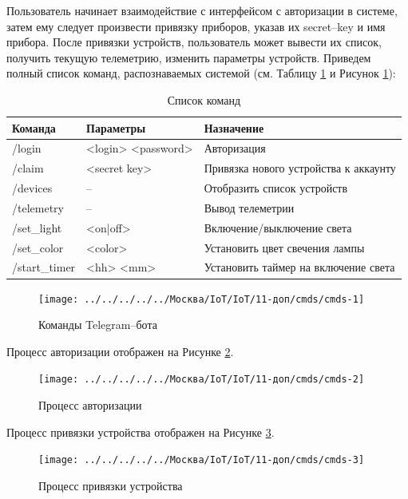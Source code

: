 \documentclass[a4paper,14pt]{extarticle}
\begin{document}
Пользователь начинает взаимодействие с интерфейсом с авторизации в системе, затем ему следует произвести привязку приборов, указав их \mbox{secret--key} и имя прибора. 
После привязки устройств, пользователь может вывести их список, получить текущую телеметрию, изменить параметры устройств. Приведем полный список команд, распознаваемых системой (см. Таблицу \ref{tab:commands} и Рисунок \ref{fig:cmds-1}):
\begin{table}[h!]
	\caption{Список команд}
	\begin{tabular}{|l|l|l|}
		\hline
		\textbf{Команда} & \textbf{Параметры} & \textbf{Назначение}\\ \hline\hline
		/login & <login> <password> & Авторизация \\ \hline
		/claim & <secret key> & Привязка нового устройства к аккаунту \\ \hline
		/devices & -- & Отобразить список устройств \\ \hline
		/telemetry & -- & Вывод телеметрии \\ \hline
		/set\_light & <on|off> & Включение/выключение света \\ \hline
		/set\_color & <color> & Установить цвет свечения лампы \\ \hline
		/start\_timer & <hh> <mm> & Установить таймер на включение света \\ \hline
	\end{tabular}
	\label{tab:commands}
\end{table}

\begin{figure}[h!]
	\centering
	\texttt{[image: ../../../../../Москва/IoT/IoT/11-доп/cmds/cmds-1]}
	\caption{Команды Telegram--бота}
	\label{fig:cmds-1}
\end{figure}

Процесс авторизации отображен на Рисунке \ref{fig:cmds-2}.
\begin{figure}[h!]
	\centering
	\texttt{[image: ../../../../../Москва/IoT/IoT/11-доп/cmds/cmds-2]}
	\caption{Процесс авторизации}
	\label{fig:cmds-2}
\end{figure}

Процесс привязки устройства отображен на Рисунке \ref{fig:cmds-3}.
\begin{figure}[h!]
	\centering
	\texttt{[image: ../../../../../Москва/IoT/IoT/11-доп/cmds/cmds-3]}
	\caption{Процесс привязки устройства}
	\label{fig:cmds-3}
\end{figure}
\end{document}
